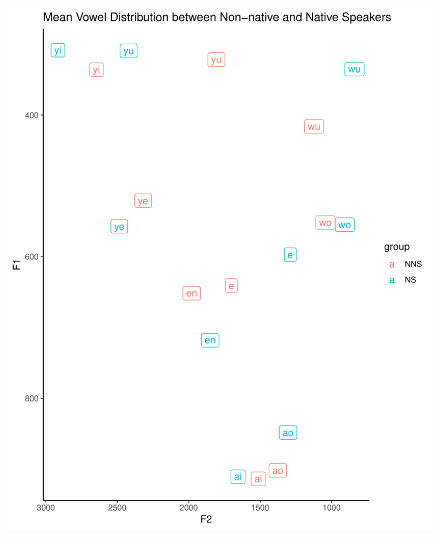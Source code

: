 \documentclass[man, fleqn, noextraspace]{apa6}
\begin{document}
\begin{figure}
\centering
\includegraphics{Vowel_v2_files/figure-latex/figure2-1.pdf}
\caption{}
\end{figure}
\end{document}
